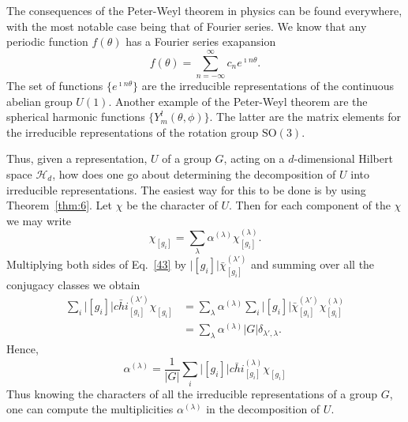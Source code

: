 \documentclass{article}
\newcommand\cH{{\mathscr{H}}}
\begin{document}
The consequences of the Peter-Weyl theorem in physics can be found everywhere, with the most notable case being that of Fourier series.  We know that any periodic function $f(\theta)$ has a Fourier series exapansion
\begin{equation}
f(\theta)=\sum_{n=-\infty}^{\infty} c_n e^{\imath n\theta}.
\label{42}
\end{equation}
The set of functions $\{e^{\imath n\theta}\}$ are the irreducible representations of the continuous abelian group $U(1)$.  Another example of the Peter-Weyl theorem are the spherical harmonic functions $\{Y^l_m(\theta, \phi)\}$.  The latter are the matrix elements for the irreducible representations of the rotation group $\mathrm{SO(3)}$.    


Thus, given a representation, $U$ of a group $G$, acting on a $d$-dimensional Hilbert space $\cH_d$, how does one go about determining the decomposition of $U$ into irreducible representations.  The easiest way for this to be done is by using Theorem~\ref{thm:6}.  Let $\chi$ be the character of $U$. Then for each component of the $\chi$ we may write
\begin{equation}
\chi_{[g_i]}=\sum_\lambda \alpha^{(\lambda)}\chi^{(\lambda)}_{[g_i]}.
\label{43}
\end{equation}
Multiplying both sides of Eq.~\eqref{43} by $\lvert[g_i]\rvert\bar{\chi}^{(\lambda')}_{[g_i]}$ and summing over all the conjugacy classes we obtain
\begin{align}\nonumber
\sum_i\lvert[g_i]\rvert\bar{chi}^{(\lambda')}_{[g_i]}\chi_{[g_i]}&=\sum_\lambda\alpha^{(\lambda)}\sum_i\lvert[g_i]\rvert\bar{\chi}^{(\lambda')}_{[g_i]}\chi^{(\lambda)}_{[g_i]}\\
&=\sum_\lambda \alpha^{(\lambda)} \lvert G \rvert \delta_{\lambda', \lambda}.
\label{44}
\end{align}
Hence,
\begin{equation}
\alpha^{(\lambda)}=\frac{1}{\lvert G\rvert}\sum_i\lvert[g_i]\rvert\bar{chi}^{(\lambda)}_{[g_i]}\chi_{[g_i]}
\label{45}
\end{equation}
Thus knowing the characters of all the irreducible representations of a group $G$, one can compute the multiplicities $\alpha^{(\lambda)}$ in the decomposition of $U$.
\end{document}
